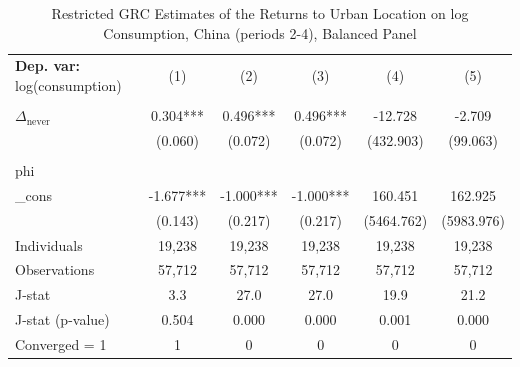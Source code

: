 \begin{table}[htbp] \centering \begin{threeparttable}
 \caption{Restricted GRC Estimates of the Returns to Urban Location on log Consumption, China (periods 2-4), Balanced Panel} 
 \label{tab:GRC_CHN234_consumption_urban_bal} 
\begin{tabular}{l ccccc} \toprule  \textbf{Dep. var:}  log(consumption) 
                    &\multicolumn{1}{c}{(1)}   &\multicolumn{1}{c}{(2)}   &\multicolumn{1}{c}{(3)}   &\multicolumn{1}{c}{(4)}   &\multicolumn{1}{c}{(5)}   \\
                    &               &               &               &               &               \\
\addlinespace
$\Delta_{\text{never}}$&       0.304***&       0.496***&       0.496***&     -12.728   &      -2.709   \\
                    &     (0.060)   &     (0.072)   &     (0.072)   &   (432.903)   &    (99.063)   \\
                    &               &               &               &               &               \\
\addlinespace
phi                 &               &               &               &               &               \\
_cons               &      -1.677***&      -1.000***&      -1.000***&     160.451   &     162.925   \\
                    &     (0.143)   &     (0.217)   &     (0.217)   &  (5464.762)   &  (5983.976)   \\
\addlinespace
Individuals         &      19,238   &      19,238   &      19,238   &      19,238   &      19,238   \\
Observations        &      57,712   &      57,712   &      57,712   &      57,712   &      57,712   \\
J-stat              &         3.3   &        27.0   &        27.0   &        19.9   &        21.2   \\
J-stat (p-value)    &       0.504   &       0.000   &       0.000   &       0.001   &       0.000   \\
Converged = 1       &           1   &           0   &           0   &           0   &           0   \\

\end{tabular}
\end{threeparttable}
\end{table}
